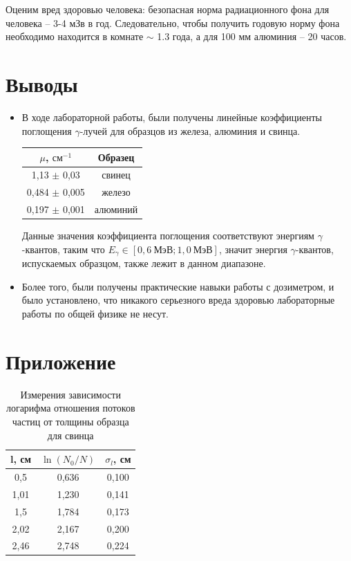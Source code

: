 \documentclass[a4paper,12pt]{article}
\begin{document}
Оценим вред здоровью человека: безопасная норма радиационного фона для человека -- 3-4 мЗв в год. Следовательно, чтобы получить годовую норму фона необходимо находится в комнате $\sim$ 1.3 года, а для 100 мм алюминия -- 20 часов.

\section*{Выводы}

\begin{itemize}
	\item В ходе лабораторной работы, были получены линейные коэффициенты поглощения $\gamma$-лучей для образцов из железа, алюминия и свинца.

\begin{table}[h]
	\centering
	\begin{tabular}{|c|c|}
	\hline
	\textbf{$\mu$, $см^{-1}$} & \textbf{Образец} \\ \hline
	1,13 $\pm$ 0,03 & свинец \\ \hline
	0,484 $\pm$ 0,005 & железо \\ \hline
	0,197 $\pm$ 0,001 & алюминий \\ \hline
\end{tabular}
\end{table}	

Данные значения коэффициента поглощения соответствуют энергиям $\gamma$-квантов, таким что $E_{\gamma} \in [0,6 \ МэВ ; 1,0 \ МэВ]$, значит энергия $\gamma$-квантов, испускаемых образцом, также лежит в данном диапазоне.

	\item Более того, были получены практические навыки работы с дозиметром, и было установлено, что никакого серьезного вреда здоровью лабораторные работы по общей физике не несут.
	
\end{itemize}

\newpage

\section*{Приложение}

\begin{table}[h]
	\caption{Измерения зависимости логарифма отношения потоков частиц от толщины образца для свинца}
	\label{table1}
	\centering
	\begin{tabular}{|c|c|c|}
	\hline
	\multicolumn{1}{|l|}{\textbf{l, см}} & \multicolumn{1}{l|}{\textbf{$\ln(N_0/N)$}} & \textbf{$\sigma_l$, см} \\ \hline
	0,5 & 0,636 & 0,100 \\ \hline
	1,01 & 1,230 & 0,141 \\ \hline
	1,5 & 1,784 & 0,173 \\ \hline
	2,02 & 2,167 & 0,200 \\ \hline
	2,46 & 2,748 & 0,224 \\ \hline
	\end{tabular}
\end{table}
\end{document}
